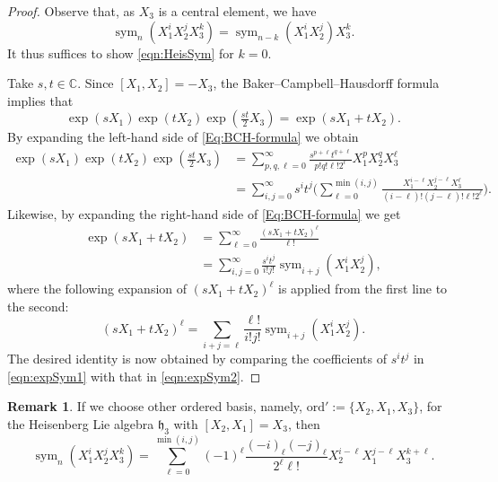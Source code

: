 \documentclass[a4paper,11pt,reqno]{amsart}
\newcommand{\frakh}{\mathfrak{h}}
\newcommand{\CC}{\mathbb{C}}
\newcommand{\0}{{\bf 0}}
\newcommand{\1}{{\bf 1}}
\newcommand{\ord}{{\mathrm{ord}}}
\DeclareMathOperator{\sym}{sym}
\theoremstyle{plain}
\theoremstyle{definition}
\newtheorem{remark}[equation]{Remark}
\numberwithin{equation}{section}
\theoremstyle{definition}
\begin{document}
\begin{proof}
Observe that, as $X_3$ is a central element, we have 
\begin{equation*}
\sym_n(X_1^iX_2^jX_3^k)=\sym_{n-k}(X_1^iX_2^j)X_3^k.
\end{equation*}
It thus suffices to show \eqref{eqn:HeisSym} for  $k=0$.

Take $s, t \in \CC$. Since $[X_1, X_2]=-X_3$, 
the Baker--Campbell--Hausdorff formula implies that 
\begin{equation}\label{Eq:BCH-formula}
\exp(sX_1)\exp(tX_2)\exp(\tfrac{st}{2}X_3)=\exp(sX_1+tX_2).
\end{equation}
By expanding the left-hand side of \eqref{Eq:BCH-formula} we obtain
\begin{align}
\exp(sX_1)\exp(tX_2)\exp(\tfrac{st}{2}X_3)
&=
\sum_{p,q,\ell=0}^\infty\frac{s^{p+\ell}t^{q+\ell}}{p!q!\ell! 2^\ell}
X_1^pX_2^qX_3^\ell \nonumber \\[3pt]
&=
\sum_{i,j=0}^\infty s^it^j\bigg(\sum_{\ell=0}^{\min(i,j)}\frac{X_1^{i-\ell}X_2^{j-\ell}X_3^\ell}{(i-\ell)!(j-\ell)!\ell!2^\ell}\bigg).\label{eqn:expSym1}
\end{align}
Likewise, by expanding the right-hand side of \eqref{Eq:BCH-formula} we get
\begin{align}
\exp(sX_1+tX_2)
&=\sum_{\ell=0}^\infty \frac{(sX_1+tX_2)^\ell}{\ell!}\nonumber\\[3pt]
&=\sum_{i,j=0}^\infty\frac{s^it^j}{i!j!}\sym_{i+j}(X_1^iX_2^j),\label{eqn:expSym2}
\end{align}
where the following expansion of $(sX_1+tX_2)^\ell$ is applied from the first line 
to the second:
\begin{equation*}
(sX_1+tX_2)^\ell
=\sum_{i+j=\ell}\frac{\ell!}{i!j!}\sym_{i+j}(X_1^iX_2^j).
\end{equation*}
The desired identity is now obtained by comparing the coefficients of 
$s^it^j$ in \eqref{eqn:expSym1} with that in \eqref{eqn:expSym2}.
\end{proof}

\begin{remark}
If we choose other ordered basis, namely,
$\ord':=\{X_2, X_1, X_3\}$, 
for the Heisenberg Lie algebra $\frakh_3$
with $[X_2, X_1]=X_3$,
then 
\begin{equation*}
\sym_n(X_1^iX_2^jX_3^k)
=\sum_{\ell=0}^{\min(i,j)}(-1)^\ell\frac{(-i)_\ell(-j)_\ell}{2^\ell \ell!}
X_2^{i-\ell}X_1^{j-\ell}X_3^{k+\ell}.
\end{equation*}
\end{remark}
 
\end{document}
